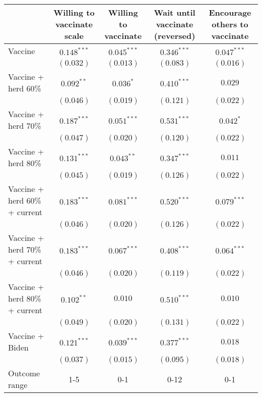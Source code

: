 \begin{table}
\begin{center}
\begin{tabular}{l c c c c}
\hline
 & Willing to vaccinate scale & Willing to vaccinate & Wait until vaccinate (reversed) & Encourage others to vaccinate \\
\hline
Vaccine                       & $0.148^{***}$ & $0.045^{***}$ & $0.346^{***}$ & $0.047^{***}$ \\
                              & $(0.032)$     & $(0.013)$     & $(0.083)$     & $(0.016)$     \\
Vaccine + herd 60\%           & $0.092^{**}$  & $0.036^{*}$   & $0.410^{***}$ & $0.029$       \\
                              & $(0.046)$     & $(0.019)$     & $(0.121)$     & $(0.022)$     \\
Vaccine + herd 70\%           & $0.187^{***}$ & $0.051^{***}$ & $0.531^{***}$ & $0.042^{*}$   \\
                              & $(0.047)$     & $(0.020)$     & $(0.120)$     & $(0.022)$     \\
Vaccine + herd 80\%           & $0.131^{***}$ & $0.043^{**}$  & $0.347^{***}$ & $0.011$       \\
                              & $(0.045)$     & $(0.019)$     & $(0.126)$     & $(0.022)$     \\
Vaccine + herd 60\% + current & $0.183^{***}$ & $0.081^{***}$ & $0.520^{***}$ & $0.079^{***}$ \\
                              & $(0.046)$     & $(0.020)$     & $(0.126)$     & $(0.022)$     \\
Vaccine + herd 70\% + current & $0.183^{***}$ & $0.067^{***}$ & $0.408^{***}$ & $0.064^{***}$ \\
                              & $(0.046)$     & $(0.020)$     & $(0.119)$     & $(0.022)$     \\
Vaccine + herd 80\% + current & $0.102^{**}$  & $0.010$       & $0.510^{***}$ & $0.010$       \\
                              & $(0.049)$     & $(0.020)$     & $(0.131)$     & $(0.022)$     \\
Vaccine + Biden               & $0.121^{***}$ & $0.039^{***}$ & $0.377^{***}$ & $0.018$       \\
                              & $(0.037)$     & $(0.015)$     & $(0.095)$     & $(0.018)$     \\
\hline
Outcome range                 & 1-5           & 0-1           & 0-12          & 0-1           \\

\end{tabular}
\end{center}
\end{table}
